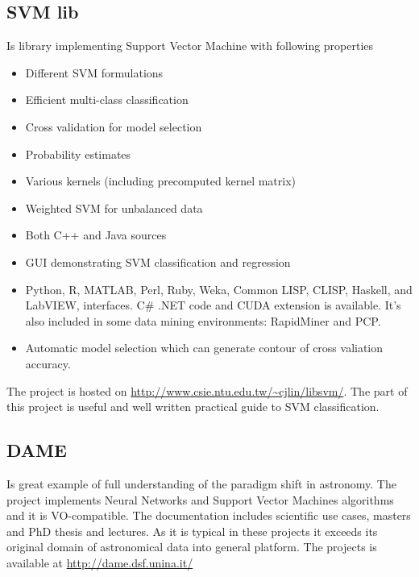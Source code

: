 \subsection{SVM lib}
Is library implementing Support Vector Machine with following properties
\begin{itemize}
    \item Different SVM formulations
    \item Efficient multi-class classification
    \item Cross validation for model selection
    \item Probability estimates
    \item Various kernels (including precomputed kernel matrix)
    \item Weighted SVM for unbalanced data
    \item Both C++ and Java sources
    \item GUI demonstrating SVM classification and regression
    \item Python, R, MATLAB, Perl, Ruby, Weka, Common LISP, CLISP,
      Haskell, and LabVIEW, interfaces. C\# .NET code and CUDA
      extension is available.  It's also included in some data mining
      environments: RapidMiner and PCP.
    \item Automatic model selection which can generate contour of
      cross valiation accuracy.
\end{itemize}

The project is hosted on
\url{http://www.csie.ntu.edu.tw/~cjlin/libsvm/}.  The part of this
project is useful and well written practical guide to SVM
classification.

\subsection{DAME}

Is great example of full understanding of the paradigm shift in
astronomy. The project implements Neural Networks and Support Vector
Machines algorithms and it is VO-compatible. The documentation includes
scientific use cases, masters and PhD thesis and lectures. As it is
typical in these projects it exceeds its original domain of
astronomical data into general platform. The projects is available at
\url{http://dame.dsf.unina.it/}

